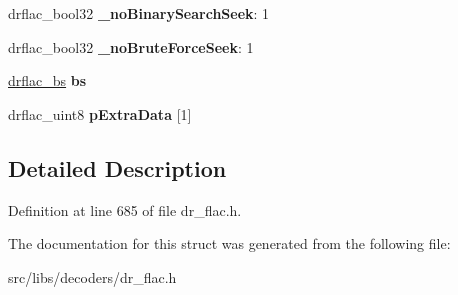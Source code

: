 \begin{DoxyCompactItemize}
\item 
\hypertarget{structdrflac_a6621f51540790fb1028990e58d67b5da}{drflac\-\_\-bool32 {\bfseries \-\_\-no\-Binary\-Search\-Seek}\-: 1}\label{structdrflac_a6621f51540790fb1028990e58d67b5da}

\item 
\hypertarget{structdrflac_a7c1e4d821f00a44f958c57ec1825b6da}{drflac\-\_\-bool32 {\bfseries \-\_\-no\-Brute\-Force\-Seek}\-: 1}\label{structdrflac_a7c1e4d821f00a44f958c57ec1825b6da}

\item 
\hypertarget{structdrflac_a6cbafadfdec413ab75efe2fbb157eee8}{\hyperlink{structdrflac__bs}{drflac\-\_\-bs} {\bfseries bs}}\label{structdrflac_a6cbafadfdec413ab75efe2fbb157eee8}

\item 
\hypertarget{structdrflac_a1892c39a1c4e6372f1ff627725b5208b}{drflac\-\_\-uint8 {\bfseries p\-Extra\-Data} \mbox{[}1\mbox{]}}\label{structdrflac_a1892c39a1c4e6372f1ff627725b5208b}

\end{DoxyCompactItemize}


\subsection{Detailed Description}


Definition at line 685 of file dr\-\_\-flac.\-h.



The documentation for this struct was generated from the following file\-:\begin{DoxyCompactItemize}
\item 
src/libs/decoders/dr\-\_\-flac.\-h\end{DoxyCompactItemize}
